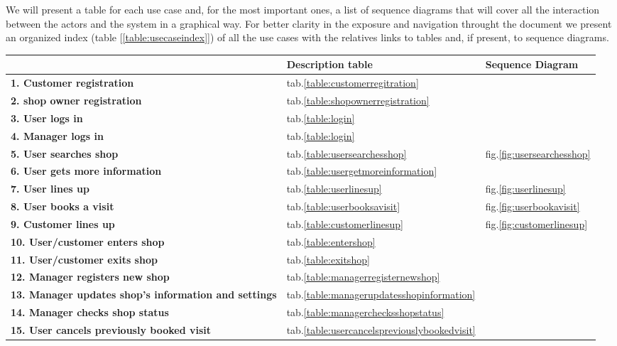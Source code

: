 We will present a table for each use case and, for the most important ones, a list of sequence diagrams that will cover all the interaction between the actors and the system in a graphical way. For better clarity in the exposure and navigation throught the document we present an organized index (table [\ref{table:usecaseindex}]) of all the use cases with the relatives links to tables and, if present, to sequence diagrams.
\begin{table}[h!]
    \centering
    \begin{tabular}{@{}P{0.57\textwidth}P{0.20\textwidth}P{0.20\textwidth}@{}}
        & \textbf{Description table} & \textbf{Sequence Diagram}\\
        \toprule
        \textbf{1. Customer registration} & tab.\ref{table:customerregitration} & \\
        \textbf{2. shop owner registration} & tab.\ref{table:shopownerregistration} & \\
        \textbf{3. User logs in} & tab.\ref{table:login} & \\
        \textbf{4. Manager logs in} & tab.\ref{table:login} & \\
        \textbf{5. User searches shop}& tab.\ref{table:usersearchesshop} & fig.\ref{fig:usersearchesshop}\\
        \textbf{6. User gets more information} & tab.\ref{table:usergetmoreinformation}& \\
        \textbf{7. User lines up} & tab.\ref{table:userlinesup} & fig.\ref{fig:userlinesup}\\
        \textbf{8. User books a visit} & tab.\ref{table:userbooksavisit} & fig.\ref{fig:userbookavisit}\\
        \textbf{9. Customer lines up} & tab.\ref{table:customerlinesup}& fig.\ref{fig:customerlinesup}\\
        \textbf{10. User/customer enters shop} & tab.\ref{table:entershop} & \\
        \textbf{11. User/customer exits shop} & tab.\ref{table:exitshop} & \\
        \textbf{12. Manager registers new shop} & tab.\ref{table:managerregisternewshop} & \\
        \textbf{13. Manager updates shop's information and settings} & tab.\ref{table:managerupdatesshopinformation} & \\
        \textbf{14. Manager checks shop status} & tab.\ref{table:managerchecksshopstatus} & \\
        \textbf{15. User cancels previously booked visit} & tab.\ref{table:usercancelspreviouslybookedvisit} & \\

\end{tabular}
\end{table}

